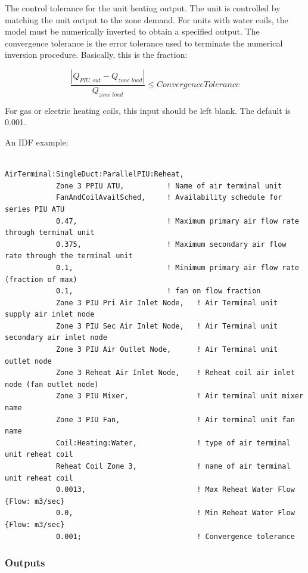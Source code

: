 The control tolerance for the unit heating output. The unit is controlled by matching the unit output to the zone demand. For units with water coils, the model must be numerically inverted to obtain a specified output. The convergence tolerance is the error tolerance used to terminate the numerical inversion procedure. Basically, this is the fraction:

\begin{equation}
\frac{{\left| {{Q_{PIU,out}} - {Q_{zone\;load}}} \right|}}{{{Q_{zone\;load}}}} \le ConvergenceTolerance
\end{equation}

For gas or electric heating coils, this input should be left blank. The default is 0.001.

An IDF example:

\begin{lstlisting}

AirTerminal:SingleDuct:ParallelPIU:Reheat,
            Zone 3 PPIU ATU,          ! Name of air terminal unit
            FanAndCoilAvailSched,     ! Availability schedule for series PIU ATU
            0.47,                     ! Maximum primary air flow rate through terminal unit
            0.375,                    ! Maximum secondary air flow rate through the terminal unit
            0.1,                      ! Minimum primary air flow rate (fraction of max)
            0.1,                      ! fan on flow fraction
            Zone 3 PIU Pri Air Inlet Node,   ! Air Terminal unit supply air inlet node
            Zone 3 PIU Sec Air Inlet Node,   ! Air Terminal unit secondary air inlet node
            Zone 3 PIU Air Outlet Node,      ! Air Terminal unit outlet node
            Zone 3 Reheat Air Inlet Node,    ! Reheat coil air inlet node (fan outlet node)
            Zone 3 PIU Mixer,                ! Air terminal unit mixer name
            Zone 3 PIU Fan,                  ! Air terminal unit fan name
            Coil:Heating:Water,              ! type of air terminal unit reheat coil
            Reheat Coil Zone 3,              ! name of air terminal unit reheat coil
            0.0013,                          ! Max Reheat Water Flow {Flow: m3/sec}
            0.0,                             ! Min Reheat Water Flow {Flow: m3/sec}
            0.001;                           ! Convergence tolerance
\end{lstlisting}

\subsubsection{Outputs}\label{outputs-8}

